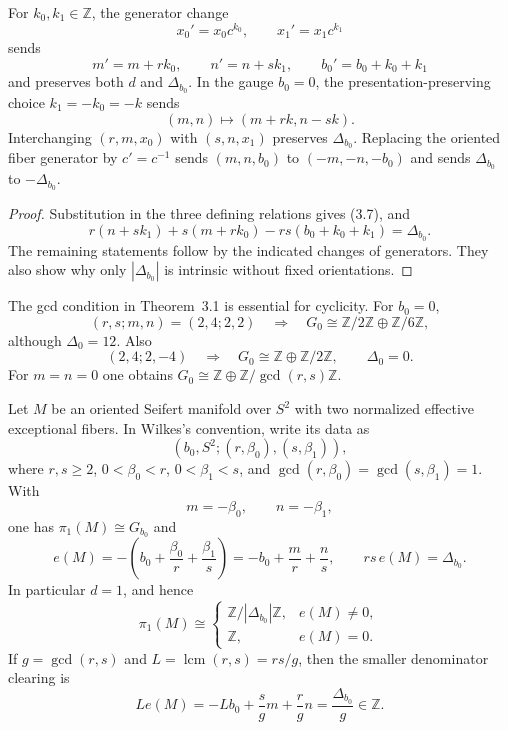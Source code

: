 \documentclass[11pt]{article}
\numberwithin{equation}{section}
\begin{document}
\begin{proposition}
For $k_0,k_1\in\mathbb Z$, the generator change
\[
 x_0'=x_0c^{k_0},\qquad x_1'=x_1c^{k_1}                            \tag{3.6}
\]
sends
\[
 m'=m+rk_0,\qquad n'=n+sk_1,\qquad b_0'=b_0+k_0+k_1             \tag{3.7}
\]
and preserves both $d$ and $\Delta_{b_0}$.  In the gauge $b_0=0$, the
presentation-preserving choice $k_1=-k_0=-k$ sends
\[
                         (m,n)\longmapsto(m+rk,n-sk).              \tag{3.8}
\]
Interchanging $(r,m,x_0)$ with $(s,n,x_1)$ preserves
$\Delta_{b_0}$.  Replacing the oriented fiber generator by $c'=c^{-1}$
sends $(m,n,b_0)$ to $(-m,-n,-b_0)$ and sends
$\Delta_{b_0}$ to $-\Delta_{b_0}$.
\end{proposition}

\begin{proof}
Substitution in the three defining relations gives (3.7), and
\[
 r(n+sk_1)+s(m+rk_0)-rs(b_0+k_0+k_1)=\Delta_{b_0}.
\]
The remaining statements follow by the indicated changes of generators.
They also show why only $|\Delta_{b_0}|$ is intrinsic without fixed
orientations.
\end{proof}

The gcd condition in Theorem~3.1 is essential for cyclicity. For $b_0=0$,
\[
 (r,s;m,n)=(2,4;2,2)\quad\Longrightarrow\quad
 G_0\cong\mathbb Z/2\mathbb Z\oplus\mathbb Z/6\mathbb Z,
\]
although $\Delta_0=12$.  Also
\[
 (2,4;2,-4)\quad\Longrightarrow\quad
 G_0\cong\mathbb Z\oplus\mathbb Z/2\mathbb Z,\qquad \Delta_0=0.
\]
For $m=n=0$ one obtains
$G_0\cong\mathbb Z\oplus\mathbb Z/\gcd(r,s)\mathbb Z$.

\begin{proposition}
Let $M$ be an oriented Seifert manifold over $S^2$ with two normalized
effective exceptional fibers. In Wilkes's convention, write its data as
\[
       (b_0,S^2;(r,\beta_0),(s,\beta_1)),                          \tag{3.9}
\]
where $r,s\ge2$, $0<\beta_0<r$, $0<\beta_1<s$, and
$\gcd(r,\beta_0)=\gcd(s,\beta_1)=1$.  With
\[
                 m=-\beta_0,\qquad n=-\beta_1,                   \tag{3.10}
\]
one has $\pi_1(M)\cong G_{b_0}$ and
\[
 e(M)=-\left(b_0+\frac{\beta_0}{r}+\frac{\beta_1}{s}\right)
      =-b_0+\frac mr+\frac ns,\qquad
 rs\,e(M)=\Delta_{b_0}.                                           \tag{3.11}
\]
In particular $d=1$, and hence
\[
 \pi_1(M)\cong
 \begin{cases}
  \mathbb Z/|\Delta_{b_0}|\mathbb Z,&e(M)\ne0,\\
  \mathbb Z,&e(M)=0.
 \end{cases}                                                       \tag{3.12}
\]
If $g=\gcd(r,s)$ and $L=\operatorname{lcm}(r,s)=rs/g$, then the smaller
denominator clearing is
\[
             L e(M)=-Lb_0+\frac{s}{g}m+\frac{r}{g}n
                    =\frac{\Delta_{b_0}}{g}\in\mathbb Z.          \tag{3.13}
\]
\end{proposition}
\end{document}
